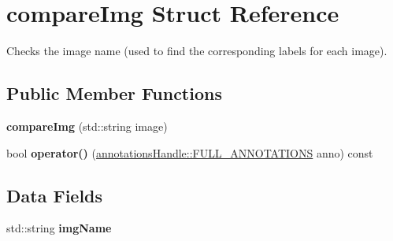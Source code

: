 \hypertarget{structcompareImg}{
\section{compareImg Struct Reference}
\label{structcompareImg}
}


Checks the image name (used to find the corresponding labels for each image).  


\subsection*{Public Member Functions}
\begin{DoxyCompactItemize}
\item 
\hypertarget{structcompareImg_ad6e09ecf48dae3dac7eaa2565f5a8261}{
{\bfseries compareImg} (std::string image)}
\label{structcompareImg_ad6e09ecf48dae3dac7eaa2565f5a8261}

\item 
\hypertarget{structcompareImg_a4e95655de9eb5261334c6e6b8c40e670}{
bool {\bfseries operator()} (\hyperlink{structannotationsHandle_1_1FULL__ANNOTATIONS}{annotationsHandle::FULL\_\-ANNOTATIONS} anno) const }
\label{structcompareImg_a4e95655de9eb5261334c6e6b8c40e670}

\end{DoxyCompactItemize}
\subsection*{Data Fields}
\begin{DoxyCompactItemize}
\item 
\hypertarget{structcompareImg_ad0300283e3530ea6ff957a1b1647013c}{
std::string {\bfseries imgName}}
\label{structcompareImg_ad0300283e3530ea6ff957a1b1647013c}

\end{DoxyCompactItemize}
